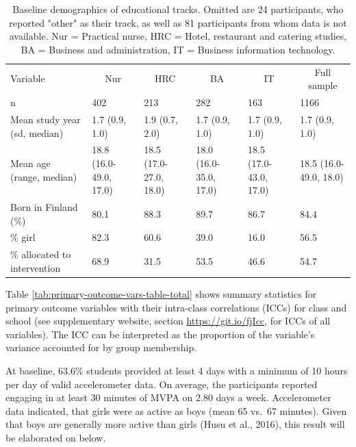 \documentclass[british,man]{apa6}
\makeatletter
\newenvironment{lltable}{\begin{landscape}\begin{center}\begin{ThreePartTable}}{\end{ThreePartTable}\end{center}\end{landscape}}
\newcommand\LastLTentrywidth{1em}
\newlength\longtablewidth
\newcommand{\getlongtablewidth}{\begingroup \ifcsname LT@\roman{LT@tables}\endcsname \global\longtablewidth=0pt \renewcommand{\LT@entry}[2]{\global\advance\longtablewidth by ##2\relax\gdef\LastLTentrywidth{##2}}\@nameuse{LT@\roman{LT@tables}} \fi \endgroup}
\makeatother
\begin{document}
\begin{lltable}


\begin{longtable}{llllll}\noalign{\getlongtablewidth\global\LTcapwidth=\longtablewidth}
\caption{\label{tab:demographics-table}Baseline demographics of educational tracks. Omitted are 24 participants, who reported "other" 
                  as their track, as well as 81 participants from whom data is not available. 
                  Nur = Practical nurse, HRC = Hotel, restaurant and catering studies, 
                  BA = Business and administration, IT = Business information technology.}\\
\toprule
Variable & \multicolumn{1}{c}{Nur} & \multicolumn{1}{c}{HRC} & \multicolumn{1}{c}{BA} & \multicolumn{1}{c}{IT} & \multicolumn{1}{c}{Full sample}\\
\midrule
n & 402 & 213 & 282 & 163 & 1166\\
Mean study year (sd, median) & 1.7 (0.9, 1.0) & 1.9 (0.7, 2.0) & 1.7 (0.9, 1.0) & 1.7 (0.9, 1.0) & 1.7 (0.9, 1.0)\\
Mean age (range, median) & 18.8 (16.0-49.0, 17.0) & 18.5 (17.0-27.0, 18.0) & 18.0 (16.0-35.0, 17.0) & 18.5 (17.0-43.0, 17.0) & 18.5 (16.0-49.0, 18.0)\\
Born in Finland (\%) & 80.1 & 88.3 & 89.7 & 86.7 & 84.4\\
\% girl & 82.3 & 60.6 & 39.0 & 16.0 & 56.5\\
\% allocated to intervention & 68.9 & 31.5 & 53.5 & 46.6 & 54.7\\
\bottomrule
\end{longtable}
\end{lltable}

Table \ref{tab:primary-outcome-vars-table-total} shows summary statistics for primary outcome variables with their intra-class correlations (ICCs) for class and school (see supplementary website, section \url{https://git.io/fjIcc}, for ICCs of all variables). The ICC can be interpreted as the proportion of the variable's variance accounted for by group membership.

At baseline, 63.6\% students provided at least 4 days with a minimum of 10 hours per day of valid accelerometer data. On average, the participants reported engaging in at least 30 minutes of MVPA on 2.80 days a week. Accelerometer data indicated, that girls were as active as boys (mean 65 vs.~67 minutes). Given that boys are generally more active than girls (Husu et al., 2016), this result will be elaborated on below.
\end{document}
